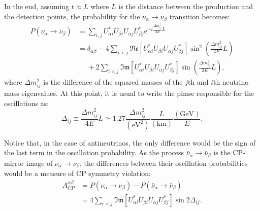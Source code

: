 In the end, assuming $t \approx L$ where $L$ is the distance between the production and the detection points, the probability for the $\nu_{\alpha} \rightarrow \nu_{\beta}$ transition becomes:
\begin{equation}
\begin{split}
P(\nu_{\alpha} \rightarrow \nu_{\beta}) &= \sum_{i,j} U^{*}_{\alpha i} U_{\beta i} U_{\alpha j} U^{*}_{\beta j} \mathrm{e}^{-i\frac{\Delta m^{2}_{ij}}{2E}L}\\
&=\delta_{\alpha\beta} - 4 \sum_{i<j} \mathfrak{Re}\left[U^{*}_{\alpha i} U_{\beta i} U_{\alpha j} U^{*}_{\beta j}\right] \sin^{2}\left(\frac{\Delta m^{2}_{ij}}{4E}L\right)\\
&\phantom{=}+ 2  \sum_{i<j} \mathfrak{Im}\left[U^{*}_{\alpha i} U_{\beta i} U_{\alpha j} U^{*}_{\beta j}\right] \sin\left(\frac{\Delta m^{2}_{ij}}{2E}L\right),
\end{split}
\end{equation}
where $\Delta m^{2}_{ij}$ is the difference of the squared masses of the $j$th and $i$th neutrino mass eigenvalues. At this point, it is usual to write the phase responsible for the oscillations as:
\begin{equation}\label{2.8}
\Delta_{ij} \equiv \frac{\Delta m^{2}_{ij}}{4E}L \simeq 1.27 \frac{\Delta m^{2}_{ij}}{(\mathrm{eV}^{2})} \frac{L}{(\mathrm{km})} \frac{(\mathrm{GeV})}{E}.
\end{equation}

Notice that, in the case of antineutrinos, the only difference would be the sign of the last term in the oscillation probability. As the process $\bar{\nu}_{\alpha} \rightarrow \bar{\nu}_{\beta}$ is the CP-mirror image of $\nu_{\alpha} \rightarrow \nu_{\beta}$, the differences between their oscillation probabilities would be a measure of CP symmetry violation:
\begin{equation}\label{2.9}
\begin{split}
A^{\alpha\beta}_{CP}&=P(\nu_{\alpha} \rightarrow \nu_{\beta})-P(\bar{\nu}_{\alpha} \rightarrow \bar{\nu}_{\beta})\\
&=4  \sum_{i<j} \mathfrak{Im}\left[U^{*}_{\alpha i} U_{\beta i} U_{\alpha j} U^{*}_{\beta j}\right] \sin 2\Delta_{ij}.
\end{split}
\end{equation}

